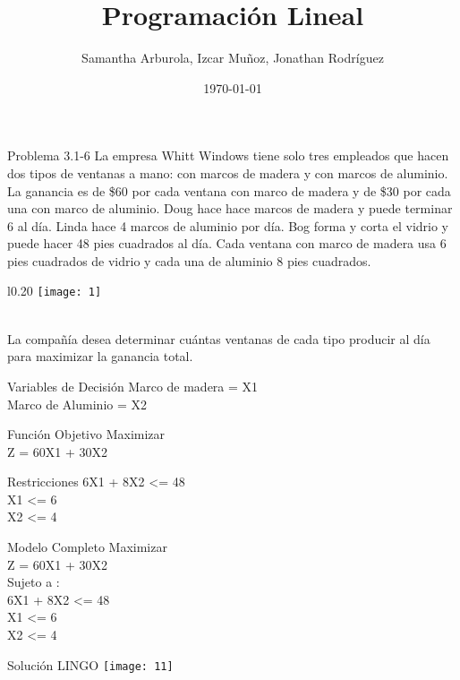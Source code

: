 \documentclass{beamer}
\author{Samantha Arburola, Izcar Muñoz, Jonathan Rodríguez}
\title{Programación Lineal}
\date{\today}
\begin{document}
\titlepageframe

\begin{frame}[t,fragile]{Problema 3.1-6}
La empresa Whitt Windows tiene solo tres empleados que hacen dos tipos de ventanas a mano: con marcos de madera y con marcos de aluminio. La ganancia es de \$60 por cada ventana con marco de madera y de \$30 por cada una con marco de aluminio. Doug hace hace marcos de madera y puede terminar 6 al día. Linda hace 4  marcos de aluminio por día. Bog forma y corta el vidrio y puede hacer 48 pies cuadrados al día. Cada ventana con marco de madera usa 6 pies cuadrados de vidrio y cada una de aluminio 8 pies cuadrados.\\ 
\begin{wrapfigure}{l}{0.20\textwidth}
    \centering
    \texttt{[image: 1]}
\end{wrapfigure}
\\La compañía desea determinar cuántas ventanas de cada tipo producir al día para maximizar la ganancia total.\\

\end{frame}

\begin{frame}[fragile]{Variables de Decisión}
Marco de madera  = X1\\
Marco de Aluminio = X2
\end{frame}

\begin{frame}[fragile]{Función Objetivo}
Maximizar\\
Z = 60X1 + 30X2
\end{frame}

\begin{frame}[fragile]{Restricciones}
6X1 + 8X2 <= 48\\
	X1 <= 6\\
	X2 <= 4\\
\end{frame}

\begin{frame}[fragile]{Modelo Completo}
Maximizar\\
Z = 60X1 + 30X2\\
Sujeto a :\\
	6X1 + 8X2 <= 48\\
	X1 <= 6\\
	X2 <= 4\\
\end{frame}

\begin{frame}[fragile]{Solución LINGO}
\texttt{[image: 11]}
\end{frame}
\end{document}
